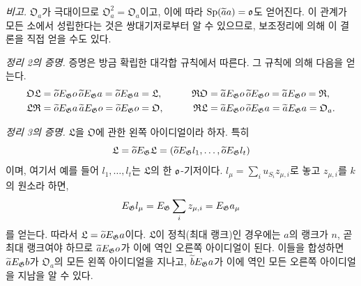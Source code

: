 \emph{비고.} $\mathfrak O_a$가 극대이므로 $\mathfrak O_a^2=\mathfrak O_a$이고, 이에 따라 $\operatorname{Sp}(\widetilde a a)=\mathfrak o$도 얻어진다. 이 관계가 모든 소에서 성립한다는 것은 쌍대기저로부터 알 수 있으므로, 보조정리에 의해 이 결론을 직접 얻을 수도 있다.

\medskip
\noindent\emph{정리 2의 증명.} 증명은 방금 확립한 대각합 규칙에서 따른다. 그 규칙에 의해 다음을 얻는다.
\[
\begin{aligned}
\mathfrak O\mathfrak L
 &=\widetilde oE_\mathfrak G o\,\widetilde oE_\mathfrak G a
 =\widetilde oE_\mathfrak G a=\mathfrak L,
&\qquad
\mathfrak R\mathfrak O
 &=\widetilde aE_\mathfrak G o\,\widetilde oE_\mathfrak G o
 =\widetilde aE_\mathfrak G o=\mathfrak R,\\
\mathfrak L\mathfrak R
 &=\widetilde oE_\mathfrak G a\,\widetilde aE_\mathfrak G o
 =\widetilde oE_\mathfrak G o=\mathfrak O,
&
\mathfrak R\mathfrak L
 &=\widetilde aE_\mathfrak G o\,\widetilde oE_\mathfrak G a
 =\widetilde aE_\mathfrak G a=\mathfrak O_a.
\end{aligned}
\]

\medskip
\noindent\emph{정리 3의 증명.} $\mathfrak L$을 $\mathfrak O$에 관한 왼쪽 아이디얼이라 하자. 특히
\[
\mathfrak L=\widetilde oE_\mathfrak G\mathfrak L
 =(\widetilde oE_\mathfrak G l_1,\ldots,\widetilde oE_\mathfrak G l_t)
\]
이며, 여기서 예를 들어 $l_1,\ldots,l_t$는 $\mathfrak L$의 한 $\mathfrak o$-기저이다. $l_\mu=\sum_i u_{S_i}z_{\mu,i}$로 놓고 $z_{\mu,i}$를 $k$의 원소라 하면,
\[
E_\mathfrak G l_\mu=E_\mathfrak G\sum_i z_{\mu,i}=E_\mathfrak G a_\mu
\]
를 얻는다. 따라서 $\mathfrak L=\widetilde oE_\mathfrak G a$이다. $\mathfrak L$이 정칙(최대 랭크)인 경우에는 $a$의 랭크가 $n$, 곧 최대 랭크여야 하므로 $\widetilde aE_\mathfrak G o$가 이에 역인 오른쪽 아이디얼이 된다. 이들을 합성하면 $\widetilde aE_\mathfrak G b$가 $\mathfrak O_a$의 모든 왼쪽 아이디얼을 지나고, $\widetilde bE_\mathfrak G a$가 이에 역인 모든 오른쪽 아이디얼을 지남을 알 수 있다.

